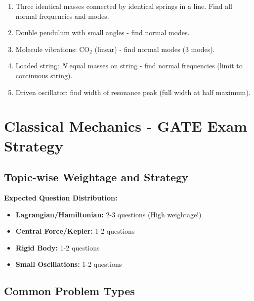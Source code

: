 \documentclass[12pt,a4paper]{article}
\theoremstyle{definition}
\begin{document}
\begin{enumerate}
    \item Three identical masses connected by identical springs in a line. Find all normal frequencies and modes.
    
    \item Double pendulum with small angles - find normal modes.
    
    \item Molecule vibrations: CO$_2$ (linear) - find normal modes (3 modes).
    
    \item Loaded string: $N$ equal masses on string - find normal frequencies (limit to continuous string).
    
    \item Driven oscillator: find width of resonance peak (full width at half maximum).
\end{enumerate}

\newpage
\section{Classical Mechanics - GATE Exam Strategy}

\subsection{Topic-wise Weightage and Strategy}

\begin{tipbox}
\textbf{Expected Question Distribution:}
\begin{itemize}
    \item \textbf{Lagrangian/Hamiltonian:} 2-3 questions (High weightage!)
    \item \textbf{Central Force/Kepler:} 1-2 questions
    \item \textbf{Rigid Body:} 1-2 questions
    \item \textbf{Small Oscillations:} 1-2 questions
\end{itemize}
\end{tipbox}

\subsection{Common Problem Types}
\end{document}
